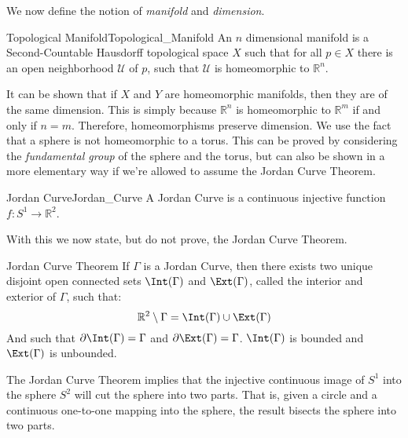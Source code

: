 \documentclass[crop=false,class=book,oneside]{standalone}                      %
\begin{document}
            We now define the notion of \textit{manifold} and
            \textit{dimension}.
            \begin{ldefinition}{Topological Manifold}{Topological_Manifold}
                An $n$ dimensional manifold is a Second-Countable Hausdorff
                topological space $X$ such that for all $p\in{X}$ there is an
                open neighborhood $\mathcal{U}$ of $p$, such that $\mathcal{U}$
                is homeomorphic to $\mathbb{R}^{n}$.
            \end{ldefinition}
            It can be shown that if $X$ and $Y$ are homeomorphic manifolds,
            then they are of the same dimension. This is simply because
            $\mathbb{R}^{n}$ is homeomorphic to $\mathbb{R}^{m}$ if and only if
            $n=m$. Therefore, homeomorphisms preserve dimension. We use the
            fact that a sphere is not homeomorphic to a torus. This can be
            proved by considering the \textit{fundamental group} of the sphere
            and the torus, but can also be shown in a more elementary way if
            we're allowed to assume the Jordan Curve Theorem.
            \begin{ldefinition}{Jordan Curve}{Jordan_Curve}
                A Jordan Curve is a continuous injective function
                $f:S^{1}\rightarrow\mathbb{R}^{2}$.
            \end{ldefinition}
            With this we now state, but do not prove, the Jordan Curve Theorem.
            \begin{ftheorem}{Jordan Curve Theorem}{}
                If $\Gamma$ is a Jordan Curve, then there exists two unique
                disjoint open connected sets $\Int(\Gamma)$ and $\Ext(\Gamma)$,
                called the interior and exterior of $\Gamma$, such that:
                \begin{equation}
                    \mathbb{R}^{2}\setminus\Gamma=\Int(\Gamma)\cup\Ext(\Gamma)
                \end{equation}
                And such that $\partial\Int(\Gamma)=\Gamma$ and
                $\partial\Ext(\Gamma)=\Gamma$. $\Int(\Gamma)$ is
                bounded and $\Ext(\Gamma)$ is unbounded.
            \end{ftheorem}
            The Jordan Curve Theorem implies that the injective continuous
            image of $S^{1}$ into the sphere $S^{2}$ will cut the
            sphere into two parts. That is, given a circle and
            a continuous one-to-one mapping into the sphere, the
            result bisects the sphere into two parts.
\end{document}
